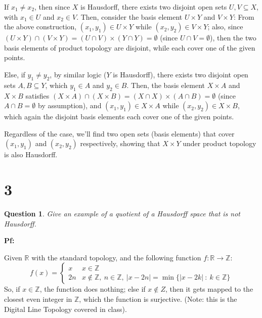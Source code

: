 \documentclass{article}
\newtheorem{question}{Question}
\begin{document}
\hfill

If $x_1\neq x_2$, then since $X$ is Hausdorff, there exists two disjoint open sets $U,V\subseteq X$, with $x_1\in U$ and $x_2\in V$.
Then, consider the basis element $U\times Y$ and $V\times Y$: From the above construction, $(x_1,y_1)\in U\times Y$ while $(x_2,y_2)\in V\times Y$;
also, since $(U\times Y)\cap (V\times Y) = (U\cap V)\times (Y\cap Y) = \emptyset$ (since $U\cap V=\emptyset$), then the two basis elements of product topology are disjoint,
while each cover one of the given points.

Else, if $y_1\neq y_2$, by similar logic ($Y$ is Hausdorff), there exists two disjoint open sets $A,B\subseteq Y$, which $y_1\in A$ and $y_2\in B$.
Then, the basis element $X\times A$ and $X\times B$ satisfies $(X\times A)\cap (X\times B)=(X\cap X)\times (A\cap B)=\emptyset$ (since $A\cap B=\emptyset$ by assumption),
and $(x_1,y_1)\in X\times A$ while $(x_2,y_2)\in X\times B$, which again the disjoint basis elements each cover one of the given points.

\hfill

Regardless of the case, we'll find two open sets (basis elements) that cover $(x_1,y_1)$ and $(x_2,y_2)$ respectively,
showing that $X\times Y$ under product topology is also Hausdorff.

\break

\section*{3}
\begin{myBox}[]{}
    \begin{question}
        Give an example of a quotient of a Hausdorff space that is not Hausdorff.
    \end{question}
\end{myBox}

\textbf{Pf:}

Given $\mathbb{R}$ with the standard topology, and the following function $f:\mathbb{R}\rightarrow\mathbb{Z}$:
$$f(x)=\begin{cases}
    x & x\in\mathbb{Z}\\
    2n & x\notin \mathbb{Z},\ n\in\mathbb{Z},\ |x-2n|=\min\{|x-2k|\ :\ k\in\mathbb{Z}\}
\end{cases}$$
So, if $x\in\mathbb{Z}$, the function does nothing; else if $x\notin Z$, then it gets mapped to the closest even integer in $\mathbb{Z}$, which the function is surjective.
(Note: this is the Digital Line Topology covered in class).
\end{document}
